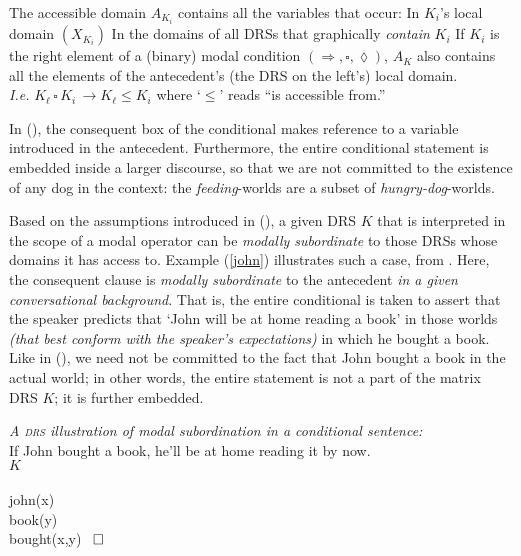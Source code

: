 \pex The accessible domain $ A_{K_i} $ contains all the variables that occur: 
\a In $ K_i $'s local domain $ (X_{K_i}) $
\a In the domains of all DRSs that graphically \textit{contain} $ K_i $
\a If $ K_i $ is the right element of a (binary) modal condition $(\Rightarrow,\square,\lozenge)$, $ A_K $ also contains all the elements of the antecedent's (the DRS on the left's) local domain.\\\textit{I.e.} $ K_\ell\,\square\,K_i\, \longrightarrow K_\ell\leqslant K_i$ where `$ \leqslant $' reads ``is accessible from.''\xe

In (\blastx), the consequent box of the conditional makes reference to a variable introduced in the antecedent. Furthermore, the entire conditional statement is embedded inside a larger discourse, so that we are not committed to the existence of any dog in the context: the \textit{feeding}-worlds are a subset of \textit{hungry-dog}-worlds.

Based on the assumptions introduced in (\lastx), a given DRS $ K $ that is interpreted in the scope of a modal operator can be \textit{modally subordinate} to those DRSs whose domains it has access to. Example (\ref{john}) illustrates such a case, from \citet[701]{Roberts1989}. Here, the consequent clause is \textit{modally subordinate} to the antecedent \textit{in a given conversational background}. That is, the entire conditional is taken to assert that the speaker predicts that `John will be at home reading a book' in those worlds \textit{(that best conform with the speaker's expectations)} in which he bought a book. Like in (\lastx), we need not be committed to the fact that John bought a book in the actual world; in other words, the entire statement is not a part of the matrix DRS $ K $; it is further embedded.


\ex \textit{A \textsc{drs} illustration of modal subordination in a conditional sentence:} \label{john}\\
If John bought a book, he'll be at home reading it by now.\\
\hspace*{.25\textwidth}$\scriptstyle K $\\
\drs{}
{\\		
	{
		john(x)\\
		book(y)\\
		bought(x,y)
	}
	~$ \boldsymbol{\LARGE\square} $		 
}\xe

